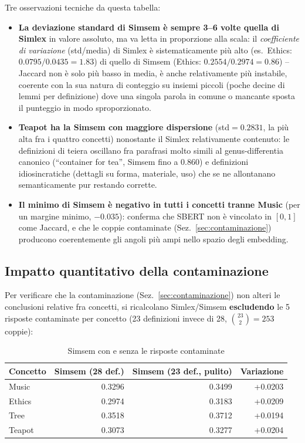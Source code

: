 \documentclass[12pt,a4paper]{article}
\begin{document}
Tre osservazioni tecniche da questa tabella:

\begin{itemize}
  \item \textbf{La deviazione standard di Simsem \`e sempre 3--6 volte quella di Simlex} in valore assoluto, ma va letta in proporzione alla scala: il \emph{coefficiente di variazione} (std/media) di Simlex \`e sistematicamente pi\`u alto (es.\ Ethics: $0.0795/0.0435=1.83$) di quello di Simsem (Ethics: $0.2554/0.2974=0.86$) -- Jaccard non \`e solo pi\`u basso in media, \`e anche relativamente pi\`u instabile, coerente con la sua natura di conteggio su insiemi piccoli (poche decine di lemmi per definizione) dove una singola parola in comune o mancante sposta il punteggio in modo sproporzionato.
  \item \textbf{Teapot ha la Simsem con maggiore dispersione} (std$=0.2831$, la pi\`u alta fra i quattro concetti) nonostante il Simlex relativamente contenuto: le definizioni di teiera oscillano fra parafrasi molto simili al genus-differentia canonico (``container for tea'', Simsem fino a $0.860$) e definizioni idiosincratiche (dettagli su forma, materiale, uso) che se ne allontanano semanticamente pur restando corrette.
  \item \textbf{Il minimo di Simsem \`e negativo in tutti i concetti tranne Music} (per un margine minimo, $-0.035$): conferma che SBERT non \`e vincolato in $[0,1]$ come Jaccard, e che le coppie contaminate (Sez.~\ref{sec:contaminazione}) producono coerentemente gli angoli pi\`u ampi nello spazio degli embedding.
\end{itemize}

\subsection{Impatto quantitativo della contaminazione}
\label{sec:contaminazione-impatto}

Per verificare che la contaminazione (Sez.~\ref{sec:contaminazione}) non alteri le conclusioni relative fra concetti, si ricalcolano Simlex/Simsem \textbf{escludendo} le 5 risposte contaminate per concetto (23 definizioni invece di 28, $\binom{23}{2}=253$ coppie):

\begin{table}[H]
  \centering
  \caption{Simsem con e senza le risposte contaminate}
  \begin{tabular}{lrrr}
    \toprule
    \textbf{Concetto} & \textbf{Simsem (28 def.)} & \textbf{Simsem (23 def., pulito)} & \textbf{Variazione} \\
    \midrule
    Music  & 0.3296 & 0.3499 & +0.0203 \\
    Ethics & 0.2974 & 0.3183 & +0.0209 \\
    Tree   & 0.3518 & 0.3712 & +0.0194 \\
    Teapot & 0.3073 & 0.3277 & +0.0204 \\
    \bottomrule
  \end{tabular}
\end{table}
\end{document}
